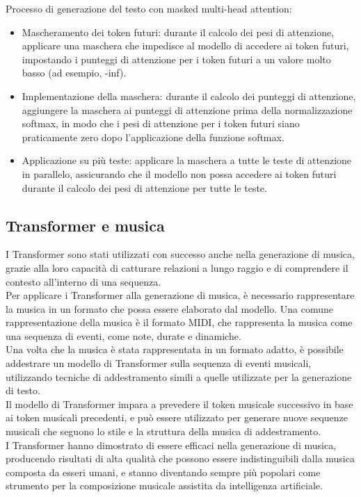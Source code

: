 Processo di generazione del testo con masked multi-head attention:
\begin{itemize}
    \item Mascheramento dei token futuri: durante il calcolo dei pesi di attenzione, applicare una maschera che impedisce al modello di accedere ai token futuri, impostando i punteggi di attenzione per i token futuri a un valore molto basso (ad esempio, -inf).
    \item Implementazione della maschera: durante il calcolo dei punteggi di attenzione, aggiungere la maschera ai punteggi di attenzione prima della normalizzazione softmax, in modo che i pesi di attenzione per i token futuri siano praticamente zero dopo l'applicazione della funzione softmax.
    \item Applicazione su più teste: applicare la maschera a tutte le teste di attenzione in parallelo, assicurando che il modello non possa accedere ai token futuri durante il calcolo dei pesi di attenzione per tutte le teste.
\end{itemize}

\subsection{Transformer e musica}
I Transformer sono stati utilizzati con successo anche nella generazione di musica, grazie alla loro capacità di catturare relazioni a lungo raggio e di comprendere il contesto all'interno di una sequenza.\\
Per applicare i Transformer alla generazione di musica, è necessario rappresentare la musica in un formato che possa essere elaborato dal modello. Una comune rappresentazione della musica è il formato MIDI,
che rappresenta la musica come una sequenza di eventi, come note, durate e dinamiche.\\
Una volta che la musica è stata rappresentata in un formato adatto, è possibile addestrare un modello di Transformer sulla sequenza di eventi musicali, utilizzando tecniche di addestramento simili a quelle utilizzate per la generazione di testo.\\
Il modello di Transformer impara a prevedere il token musicale successivo in base ai token musicali precedenti, e può essere utilizzato per generare nuove sequenze musicali che seguono lo stile e la struttura della musica di addestramento.\\
I Transformer hanno dimostrato di essere efficaci nella generazione di musica, producendo risultati di alta qualità che possono essere indistinguibili dalla musica composta da esseri umani, e stanno diventando sempre più popolari come strumento per la 
composizione musicale assistita da intelligenza artificiale.\\

